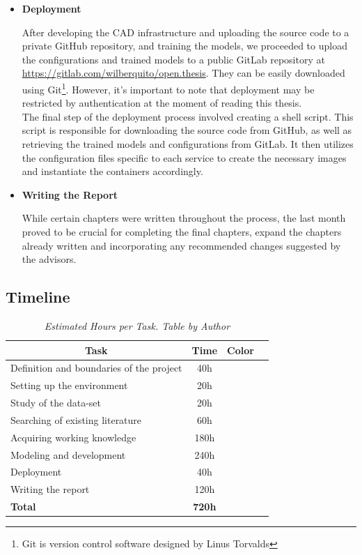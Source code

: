 \begin{itemize}
\item{\textbf{Deployment}}

After developing the CAD infrastructure and uploading the source code to a private GitHub repository, and training the models,
we proceeded to upload the configurations and trained models to a public
GitLab repository at \url{https://gitlab.com/wilberquito/open.thesis}.
They can be easily downloaded using Git\footnote{Git is version control software designed by Linus Torvalds}.
However, it's important to note that deployment may be restricted by authentication at the moment of reading this thesis. \\

The final step of the deployment process involved creating a shell script.
This script is responsible for downloading the source code from GitHub,
as well as retrieving the trained models and configurations from GitLab.
It then utilizes the configuration files specific to each service to create the necessary
images and instantiate the containers accordingly.

\item{\textbf{Writing the Report}}

While certain chapters were written throughout the process, the last month proved to be crucial for completing the final chapters, expand the chapters already written and incorporating any recommended changes suggested by the advisors.

\end{itemize}

\newpage

\subsection{Timeline}

\begin{table}[H]
\centering
\begin{tabular}{| l | c | c | c |}
\hline
\multicolumn{1}{|c|}{\textbf{Task}} & \multicolumn{1}{c|}{\textbf{Time}} & \multicolumn{1}{c|}{\textbf{Color}} \\
\hline
Definition and boundaries of the project & 40h & \cellcolor{red!50} \\
\hline
Setting up the environment & 20h & \cellcolor{lime!50} \\
\hline
Study of the data-set & 20h & \cellcolor{blue!40} \\
\hline
Searching of existing literature & 60h & \cellcolor{teal!50} \\
\hline
Acquiring working knowledge & 180h & \cellcolor{amber!30} \\
\hline
Modeling and development & 240h & \cellcolor{black!70} \\
\hline
Deployment & 40h & \cellcolor{gray!50} \\
\hline
Writing the report & 120h & \cellcolor{orange!50} \\
\hline
\textbf{Total} & \textbf{720h} & \\
\hline
\end{tabular}
\caption[Estimated Hours per Task.]{\textit{Estimated Hours per Task. Table by Author}}
{\label{table:timeline_tasks}}
\end{table}

